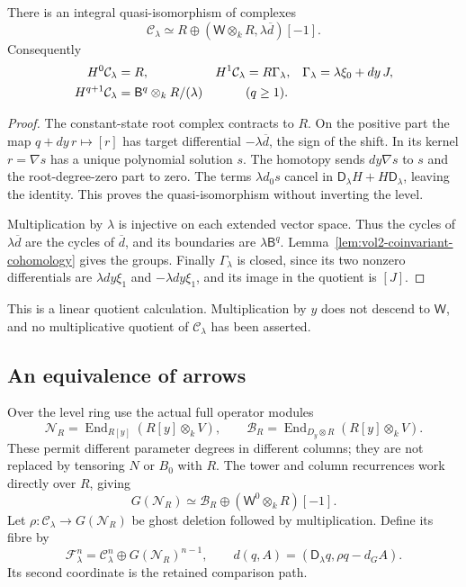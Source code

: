\begin{theorem}\label{thm:vol2-integral-current}
There is an integral quasi-isomorphism of complexes
\begin{equation}\label{eq:vol2-integral-current-reduction}
 \mathcal C_\lambda\simeq
 R\oplus(\mathsf W\otimes_kR,\lambda\overline d)[-1].
\end{equation}
Consequently
\begin{align}\label{eq:vol2-integral-current-cohomology}
 H^0\mathcal C_\lambda&=R,&
 H^1\mathcal C_\lambda&=R\Gamma_\lambda,
       &\Gamma_\lambda&=\lambda\xi_0+dy\,J,\notag\\
 H^{q+1}\mathcal C_\lambda&=\mathsf B^q\otimes_kR/(\lambda)
       &&(q\geq1).
\end{align}
\end{theorem}
\begin{proof}
The constant-state root complex contracts to $R$. On the positive
part the map $q+dy\,r\mapsto[r]$ has target differential
$-\lambda\overline d$, the sign of the shift. In its kernel
$r=\nabla s$ has a unique polynomial solution $s$. The homotopy
sends $dy\nabla s$ to $s$ and the root-degree-zero part to zero.
The terms $\lambda d_0s$ cancel in $\mathsf D_\lambda H+
H\mathsf D_\lambda$, leaving the identity. This proves the
quasi-isomorphism without inverting the level.

Multiplication by $\lambda$ is injective on each extended vector
space. Thus the cycles of $\lambda\overline d$ are the cycles of
$\overline d$, and its boundaries are $\lambda\mathsf B^q$.
Lemma~\ref{lem:vol2-coinvariant-cohomology} gives the groups.
Finally $\Gamma_\lambda$ is closed, since its two nonzero
differentials are $\lambda dy\xi_1$ and $-\lambda dy\xi_1$,
and its image in the quotient is $[J]$.
\end{proof}

This is a linear quotient calculation. Multiplication by $y$ does
not descend to $\mathsf W$, and no multiplicative quotient of
$\mathcal C_\lambda$ has been asserted.

\subsection{An equivalence of arrows}

Over the level ring use the actual full operator modules
\[
 \mathcal N_R=\operatorname{End}_{R[y]}(R[y]\otimes_kV),
 \qquad
 \mathcal B_R=\operatorname{End}_{D_y\otimes R}(R[y]\otimes_kV).
\]
These permit different parameter degrees in different columns;
they are not replaced by tensoring $N$ or $B_0$ with $R$.
The tower and column recurrences work directly over $R$, giving
\[
 G(\mathcal N_R)\simeq
 \mathcal B_R\oplus(\mathsf W^0\otimes_kR)[-1].
\]
Let $\rho:\mathcal C_\lambda\to G(\mathcal N_R)$ be ghost deletion
followed by multiplication. Define its fibre by
\begin{equation}\label{eq:vol2-integral-fibre-convention}
 \mathcal F_\lambda^n=\mathcal C_\lambda^n\oplus
                  G(\mathcal N_R)^{n-1},\qquad
 d(q,A)=(\mathsf D_\lambda q,\rho q-d_GA).
\end{equation}
Its second coordinate is the retained comparison path.

